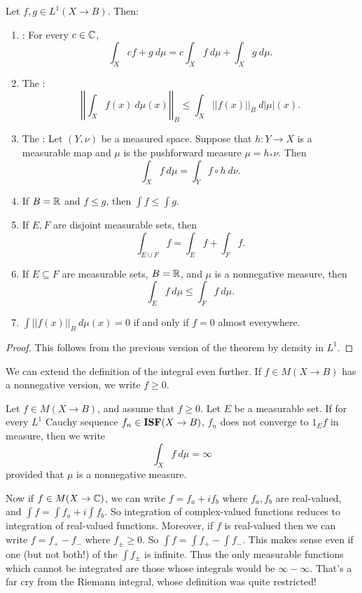 \begin{theorem}
Let $f,g \in L^1(X \to B)$. Then:
\begin{enumerate}
\item {}: For every $c \in \mathbb{C}$,
\[\int_X cf + g~d\mu = c\int_X f ~d\mu + \int_X g~d\mu.\]
\item The :
\[\left|\left|\int_X f(x) ~d\mu(x)\right|\right|_B \leq \int_X ||f(x)||_B~d|\mu|(x).\]
\item The : Let $(Y, \nu)$ be a measured space. Suppose that $h: Y \to X$ is a measurable map and $\mu$ is the pushforward measure $\mu = h_*\nu$. Then
\[\int_X f~d\mu = \int_Y f \circ h~d\nu.\]
\item If $B = \mathbb{R}$ and $f \leq g$, then $\int f \leq \int g$.
\item If $E,F$ are disjoint measurable sets, then
\[\int_{E \cup F} f = \int_E f + \int_F f.\]
\item If $E \subseteq F$ are measurable sets, $B = \mathbb{R}$, and $\mu$ is a nonnegative measure, then
\[\int_E f~d\mu \leq \int_F f~d\mu.\]
\item $\int ||f(x)||_B ~d\mu(x) = 0$ if and only if $f = 0$ almost everywhere.
\end{enumerate}
\end{theorem}
\begin{proof}
This follows from the previous version of the theorem by density in $L^1$.
\end{proof}

\begin{subsec}
We can extend the definition of the integral even further.
If $f \in M(X \to B)$ has a nonnegative version, we write $f \geq 0$.
\end{subsec}

\begin{definition}
Let $f \in M(X \to B)$, and assume that $f \geq 0$. Let $E$ be a measurable set. If for every $L^1$ Cauchy sequence $f_n \in \mathbf{ISF}(X \to B)$, $f_n$ does not converge to $1_E f$ in measure, then we write
\[\int_X f ~d\mu = \infty\]
provided that $\mu$ is a nonnegative measure.
\end{definition}

\begin{subsec}
Now if $f \in M(X \to \mathbb{C})$, we can write $f = f_a + if_b$ where $f_a, f_b$ are real-valued, and $\int f = \int f_a + i\int f_b$.
So integration of complex-valued functions reduces to integration of real-valued functions. Moreover, if $f$ is real-valued then we can write $f = f_+ - f_-$ where $f_\pm \geq 0$. So $\int f = \int f_+ - \int f_-$.
This makes sense even if one (but not both!) of the $\int f_\pm$ is infinite.
Thus the only measurable functions which cannot be integrated are those whose integrals would be $\infty - \infty$.
That's a far cry from the Riemann integral, whose definition was quite restricted!
\end{subsec}

